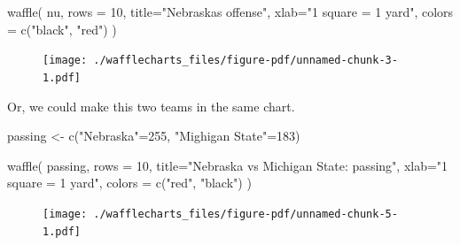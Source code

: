 \documentclass[
  letterpaper,
  DIV=11,
  numbers=noendperiod]{scrreprt}
\newenvironment{Shaded}{\begin{snugshade}}{\end{snugshade}}
\newcommand{\AttributeTok}[1]{\textcolor[rgb]{0.40,0.45,0.13}{#1}}
\newcommand{\DecValTok}[1]{\textcolor[rgb]{0.68,0.00,0.00}{#1}}
\newcommand{\FunctionTok}[1]{\textcolor[rgb]{0.28,0.35,0.67}{#1}}
\newcommand{\NormalTok}[1]{\textcolor[rgb]{0.00,0.23,0.31}{#1}}
\newcommand{\OtherTok}[1]{\textcolor[rgb]{0.00,0.23,0.31}{#1}}
\newcommand{\StringTok}[1]{\textcolor[rgb]{0.13,0.47,0.30}{#1}}
\begin{document}
\begin{Shaded}
\begin{Highlighting}[]
\FunctionTok{waffle}\NormalTok{(}
\NormalTok{        nu, }
        \AttributeTok{rows =} \DecValTok{10}\NormalTok{, }
        \AttributeTok{title=}\StringTok{"Nebraska\textquotesingle{}s offense"}\NormalTok{, }
        \AttributeTok{xlab=}\StringTok{"1 square = 1 yard"}\NormalTok{, }
        \AttributeTok{colors =} \FunctionTok{c}\NormalTok{(}\StringTok{"black"}\NormalTok{, }\StringTok{"red"}\NormalTok{)}
\NormalTok{)}
\end{Highlighting}
\end{Shaded}

\begin{figure}[H]

{\centering \texttt{[image: ./wafflecharts\_files/figure-pdf/unnamed-chunk-3-1.pdf]}

}

\end{figure}

Or, we could make this two teams in the same chart.

\begin{Shaded}
\begin{Highlighting}[]
\NormalTok{passing }\OtherTok{\textless{}{-}} \FunctionTok{c}\NormalTok{(}\StringTok{"Nebraska"}\OtherTok{=}\DecValTok{255}\NormalTok{, }\StringTok{"Mighigan State"}\OtherTok{=}\DecValTok{183}\NormalTok{)}
\end{Highlighting}
\end{Shaded}

\begin{Shaded}
\begin{Highlighting}[]
\FunctionTok{waffle}\NormalTok{(}
\NormalTok{        passing, }
        \AttributeTok{rows =} \DecValTok{10}\NormalTok{, }
        \AttributeTok{title=}\StringTok{"Nebraska vs Michigan State: passing"}\NormalTok{, }
        \AttributeTok{xlab=}\StringTok{"1 square = 1 yard"}\NormalTok{, }
        \AttributeTok{colors =} \FunctionTok{c}\NormalTok{(}\StringTok{"red"}\NormalTok{, }\StringTok{"black"}\NormalTok{)}
\NormalTok{)}
\end{Highlighting}
\end{Shaded}

\begin{figure}[H]

{\centering \texttt{[image: ./wafflecharts\_files/figure-pdf/unnamed-chunk-5-1.pdf]}

}

\end{figure}
\end{document}
